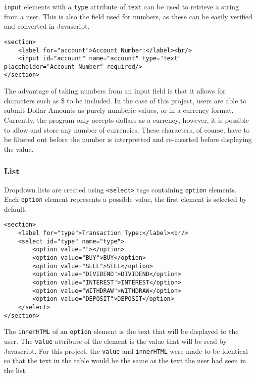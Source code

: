 \documentclass[letterpaper]{article}
\begin{document}
\lstinline{input} elements with a \lstinline{type} attribute of \lstinline{text} can be used to retrieve a string from a user.
This is also the field used for numbers, as these can be easily verified and converted in Javascript.

\begin{lstlisting}[firstnumber=16]
<section>
    <label for="account">Account Number:</label><br/>
    <input id="account" name="account" type="text" placeholder="Account Number" required/>
</section>
\end{lstlisting}

The advantage of taking numbers from an input field is that it allows for characters such as \$ to be included.
In the case of this project, users are able to submit Dollar Amounts as purely numberic values, or in a currency format.
Currently, the program only accepts dollars as a currency, however, it is possible to allow and store any number of currencies.
These characters, of course, have to be filtered out before the number is interpretted and re-inserted before displaying the value.

\subsubsection{List}

Dropdown lists are created using \lstinline{<select>} tags containing \lstinline{option} elements.
Each \lstinline{option} element represents a possible value, the first element is selected by default.

\begin{lstlisting}[firstnumber=21]
<section>
    <label for="type">Transaction Type:</label><br/>
    <select id="type" name="type">
        <option value=""></option>
        <option value="BUY">BUY</option>
        <option value="SELL">SELL</option>
        <option value="DIVIDEND">DIVIDEND</option>
        <option value="INTEREST">INTEREST</option>
        <option value="WITHDRAW">WITHDRAW</option>
        <option value="DEPOSIT">DEPOSIT</option>
    </select>
</section>
\end{lstlisting}

The \lstinline{innerHTML} of an \lstinline{option} element is the text that will be displayed to the user.
The \lstinline{value} attribute of the element is the value that will be read by Javascript.
For this project, the \lstinline{value} and \lstinline{innerHTML} were made to be identical so that the text in the table would be the same as the text the user had seen in the list.
\end{document}

